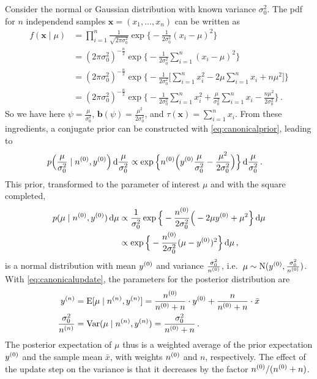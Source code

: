 \documentclass[12pt,a4paper	,twoside]{article}
\newcommand{\dd}{\,\mathrm{d}}
\newcommand{\mbf}[1]{\mathbf{#1}}
\newcommand{\bs}[1]{\boldsymbol{#1}}
\renewcommand{\vec}[1]{{\bs#1}}
\newcommand{\E}{\operatorname{E}}
\newcommand{\V}{\operatorname{Var}}
\newcommand{\norm}{\operatorname{N}}
\begin{document}
Consider the normal or Gaussian distribution with known variance $\sigma^2_0$.
The pdf for $n$ independend samples $\vec{x} = (x_1,\ldots,x_n)$
can be written as
\begin{align}
\label{eq:normaldens}
f(\vec{x}\mid\mu)
 &= \prod_{i=1}^n \frac{1}{\sqrt{2\pi\sigma_0^2}} \exp\Big\{ -\frac{1}{2\sigma_0^2} (x_{i} - \mu)^2 \Big\} \nonumber\\
 &= (2\pi\sigma_0^2)^{-\frac{n}{2}}\exp\Big\{ -\frac{1}{2\sigma_0^2} \sum_{i=1}^n (x_{i} - \mu)^2 \Big\} \\
 &= (2\pi\sigma_0^2)^{-\frac{n}{2}}
    \exp\Big\{ -\frac{1}{2\sigma_0^2} \Big[ \sum_{i=1}^n x_{i}^2 -2\mu\sum_{i=1}^n x_{i} + n\mu^2 \Big] \Big\} \nonumber\\
 &= (2\pi\sigma_0^2)^{-\frac{n}{2}}
    \exp\Big\{ -\frac{1}{2\sigma_0^2} \sum_{i=1}^n x_{i}^2 +\frac{\mu}{\sigma_0^2} \sum_{i=1}^n x_{i} - \frac{n \mu^2}{2\sigma_0^2} \Big\}\,.
\end{align}
So we have here $\psi = \frac{\mu}{\sigma_0^2}$, $\mbf{b}(\psi) = \frac{\mu^2}{2\sigma_0^2}$, and $\tau(\vec{x}) = \sum_{i=1}^n x_i$.
From these ingredients, a conjugate prior can be constructed with \eqref{eq:canonicalprior}, leading to
\begin{align}
p\Big(\frac{\mu}{\sigma_0^2} \mid \nz, \yz\Big) \dd\frac{\mu}{\sigma_0^2}
 &\propto \exp\Big\{ \nz \Big(\yz \frac{\mu}{\sigma_0^2} - \frac{\mu^2}{2\sigma_0^2} \Big) \Big\} \dd\frac{\mu}{\sigma_0^2}\,.
\end{align}
This prior, transformed to the parameter of interest $\mu$ and with the square completed,
\begin{align}
p(\mu \mid \nz, \yz) \dd\mu
 &\propto \frac{1}{\sigma_0^2} \exp\Big\{ -\frac{\nz}{2\sigma_0^2} \Big(-2\mu\yz + \mu^2\Big\} \dd\mu \nonumber\\
 &\propto \exp\Big\{ -\frac{\nz}{2\sigma_0^2} (\mu - \yz)^2 \Big\} \dd\mu\,,
\end{align}
is a normal distribution with mean $y^{(0)}$ and variance $\frac{\sigma_0^2}{n^{(0)}}$,
i.e.\ $\mu \sim \norm(\yz, \frac{\sigma_0^2}{\nz})$.
With \eqref{eq:canonicalupdate}, the parameters for the posterior distribution are
\begin{align}
\yn &= \E[\mu\mid\nn, \yn] = \frac{\nz}{\nz + n} \cdot \yz + \frac{n}{\nz + n} \cdot \bar{x} \label{eq:normalposte}\\
\frac{\sigma_0^2}{\nn} &= \V(\mu\mid\nn, \yn) = \frac{\sigma_0^2}{\nz + n}\,. \label{eq:normalpostvar}
\end{align}
The posterior expectation of $\mu$ thus is a weighted average of the prior expectation $y^{(0)}$ and the sample mean $\bar{x}$,
with weights $n^{(0)}$ and $n$, respectively.
The effect of the update step on the variance is that it decreases by the factor $n^{(0)}/(n^{(0)}+n)$.
\end{document}
